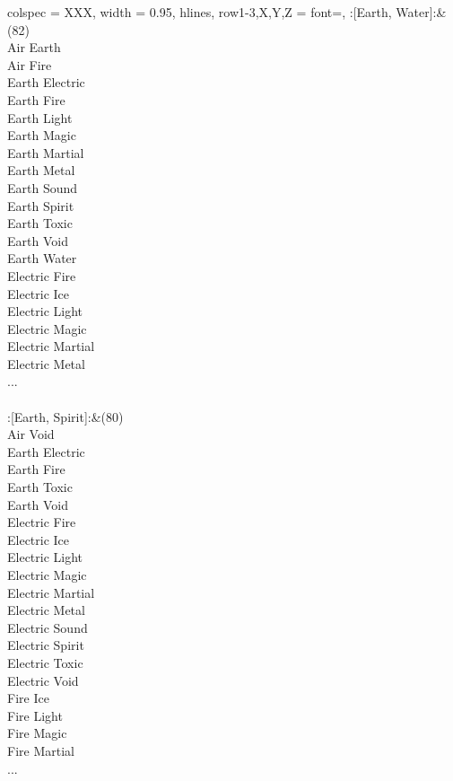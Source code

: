 \begin{longtblr}[
	caption = {2v2 Attacking Effective},
	label = {2v2-Attacking-Effective},
]{
	colspec = {XXX}, width = 0.95\linewidth,
	hlines,
	row{1-3,X,Y,Z} = {font=\bfseries},
}
	:[Earth, Water]:&{(82)\\
	Air Earth \\
	Air Fire \\
	Earth Electric \\
	Earth Fire \\
	Earth Light \\
	Earth Magic \\
	Earth Martial \\
	Earth Metal \\
	Earth Sound \\
	Earth Spirit \\
	Earth Toxic \\
	Earth Void \\
	Earth Water \\
	Electric Fire \\
	Electric Ice \\
	Electric Light \\
	Electric Magic \\
	Electric Martial \\
	Electric Metal \\
	...\\
	}\\

	:[Earth, Spirit]:&{(80)\\
	Air Void \\
	Earth Electric \\
	Earth Fire \\
	Earth Toxic \\
	Earth Void \\
	Electric Fire \\
	Electric Ice \\
	Electric Light \\
	Electric Magic \\
	Electric Martial \\
	Electric Metal \\
	Electric Sound \\
	Electric Spirit \\
	Electric Toxic \\
	Electric Void \\
	Fire Ice \\
	Fire Light \\
	Fire Magic \\
	Fire Martial \\
	...\\
	}\\


\end{longtblr}
